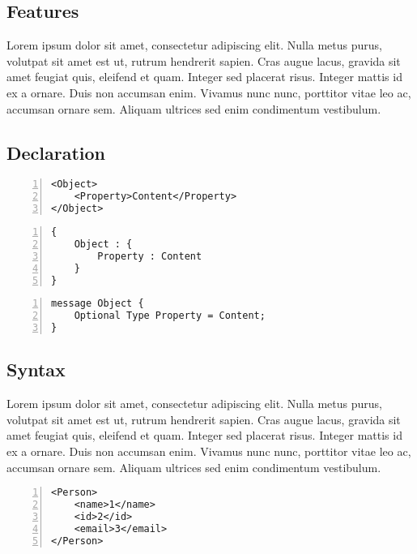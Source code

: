 \documentclass[../report.tex]{subfiles}
\begin{document}
\subsection{Features}

Lorem ipsum dolor sit amet, consectetur adipiscing elit. Nulla metus purus, volutpat sit amet est ut, rutrum hendrerit sapien. Cras augue lacus, gravida sit amet feugiat quis, eleifend et quam. Integer sed placerat risus. Integer mattis id ex a ornare. Duis non accumsan enim. Vivamus nunc nunc, porttitor vitae leo ac, accumsan ornare sem. Aliquam ultrices sed enim condimentum vestibulum.

\subsection{Declaration}

\begin{Verbatim}[frame=single,numbers=left,framesep=5mm,label=XML Object]
<Object>
    <Property>Content</Property>
</Object>
\end{Verbatim}

\vspace{1mm}

\begin{Verbatim}[frame=single,numbers=left,framesep=5mm,label=JSON Object]
{
    Object : {
        Property : Content
    }
}
\end{Verbatim}

\vspace{1mm}

\begin{Verbatim}[frame=single,numbers=left,framesep=5mm,label=Proto Object]
message Object {
    Optional Type Property = Content;
}
\end{Verbatim}

\subsection{Syntax}

Lorem ipsum dolor sit amet, consectetur adipiscing elit. Nulla metus purus, volutpat sit amet est ut, rutrum hendrerit sapien. Cras augue lacus, gravida sit amet feugiat quis, eleifend et quam. Integer sed placerat risus. Integer mattis id ex a ornare. Duis non accumsan enim. Vivamus nunc nunc, porttitor vitae leo ac, accumsan ornare sem. Aliquam ultrices sed enim condimentum vestibulum. \\

\begin{Verbatim}[frame=single,numbers=left,framesep=5mm,label=XML Object]
<Person>
    <name>1</name>
    <id>2</id>
    <email>3</email>
</Person>
\end{Verbatim}
\end{document}
